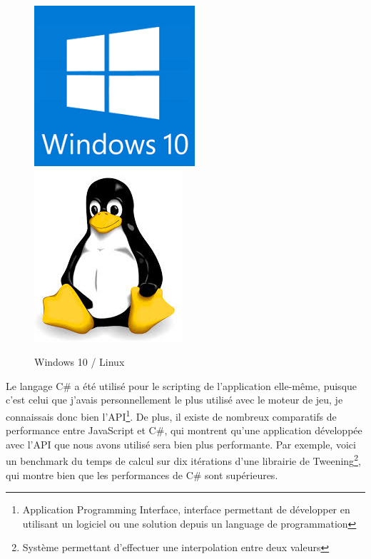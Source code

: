 \documentclass[a4paper]{article}
\begin{document}
    \begin{figure}[H]
        \centering
        \includegraphics[scale=0.5]{img/logo-w10}
        \hspace{10pt}
        \includegraphics[scale=0.5]{img/logo-linux}
        \caption{Windows 10 / Linux}
    \end{figure}
    
    \newpage

    Le langage C\# a été utilisé pour le scripting de l'application elle-même, puisque c'est celui que j'avais personnellement le plus utilisé avec le moteur de jeu, je connaissais donc bien l'API\footnote{Application Programming Interface, interface permettant de développer en utilisant un logiciel ou une solution depuis un language de programmation}. De plus, il existe de nombreux comparatifs de performance entre JavaScript et C\#, qui montrent qu'une application développée avec l'API que nous avons utilisé sera bien plus performante. Par exemple, voici un benchmark du temps de calcul sur dix itérations d'une librairie de Tweening\footnote{Système permettant d'effectuer une interpolation entre deux valeurs}, qui montre bien que les performances de C\# sont supérieures. \\
\end{document}
